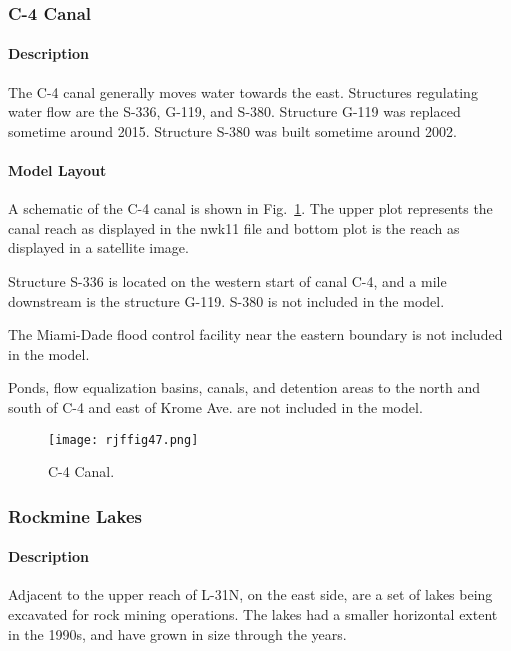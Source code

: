 \subsubsection{C-4 Canal}
\paragraph{Description}
The C-4 canal generally moves water towards the east. Structures regulating water flow are the S-336, G-119, and S-380.  Structure G-119 was replaced sometime around 2015.  Structure S-380 was built sometime around 2002.

\paragraph{Model Layout}
A schematic of the C-4 canal is shown in Fig.~\ref{fig:rjffig47}. The upper plot represents the canal reach as displayed in the nwk11 file and bottom plot is the reach as displayed in a satellite image.

Structure S-336 is located on the western start of canal C-4, and a mile downstream is the structure G-119. S-380 is not included in the model.

The Miami-Dade flood control facility near the eastern boundary is not included in the model.

Ponds, flow equalization basins, canals, and detention areas to the north and south of C-4 and east of Krome Ave. are not included in the model.

\begin{figure}[!h]
  \begin{center}
  \texttt{[image: rjffig47.png]}
  \caption{C-4 Canal.}
  \label{fig:rjffig47}
  \end{center}
\end{figure}


\clearpage

\subsubsection{Rockmine Lakes}
\paragraph{Description}
Adjacent to the upper reach of L-31N, on the east side, are a set of lakes being excavated for rock mining operations. The lakes had a smaller horizontal extent in the 1990s, and have grown in size through the years.


